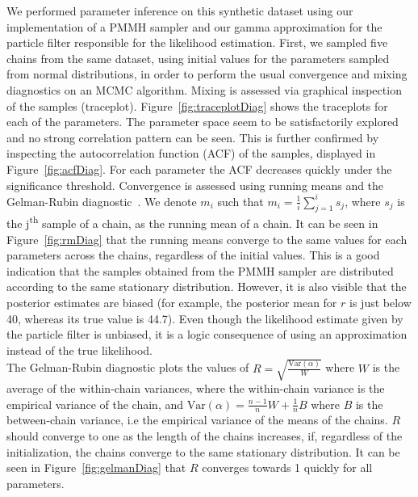 \documentclass[12pt]{article}
\begin{document}
\clearpage
	We performed parameter inference on this synthetic dataset using our implementation of a PMMH sampler and our gamma approximation for the particle filter responsible for the likelihood estimation. First, we sampled five chains from the same dataset, using initial values for the parameters sampled from normal distributions,  in order to perform the usual convergence and mixing diagnostics on an MCMC algorithm. Mixing is assessed via graphical inspection of the samples (traceplot). Figure~\ref{fig:traceplotDiag} shows the traceplots for each of the parameters. The parameter space seem to be satisfactorily explored and no strong correlation pattern can be seen. This is further confirmed by inspecting the autocorrelation function (ACF) of the samples, displayed in Figure~\ref{fig:acfDiag}. For each parameter the ACF decreases quickly under the significance threshold. Convergence is assessed using running means and the Gelman-Rubin diagnostic~\cite{gelman1992inference}. We denote $m_i$ such that $m_i=\frac{1}{i}\sum_{j=1}^{i}s_j$, where $s_j$ is the j\textsuperscript{th} sample of a chain, as the running mean of a chain. It can be seen in Figure~\ref{fig:rmDiag} that the running means converge to the same values for each parameters across the chains, regardless of the initial values. This is a good indication that the samples obtained from the PMMH sampler are distributed according to the same stationary distribution. However, it is also visible that the posterior estimates are biased (for example, the posterior mean for $r$ is just below 40, whereas its true value is 44.7). Even though the likelihood estimate given by the particle filter is unbiased, it is a logic consequence of using an approximation instead of the true likelihood. \\
	The Gelman-Rubin diagnostic plots the values of $R = \sqrt{\frac{\mathrm{Var}(\alpha)}{W}}$ where $W$ is the average of the within-chain variances, where the within-chain variance is the empirical variance of the chain, and $ \mathrm{Var}(\alpha) = \frac{n-1}{n}W + \frac{1}{n}B$ where $B$ is the between-chain variance, i.e the empirical variance of the means of the chains. $R$ should converge to one as the length of the chains increases, if, regardless of the initialization, the chains converge to the same stationary distribution. It can be seen in Figure~\ref{fig:gelmanDiag} that $R$ converges towards 1 quickly for all parameters. 
	
\end{document}
